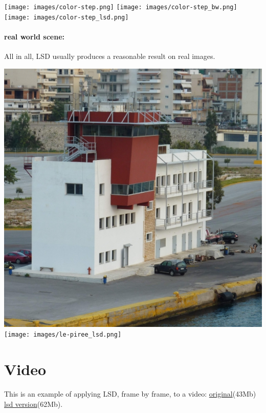 \documentclass{ipol}
\begin{document}
\begin{center}
\texttt{[image: images/color-step.png]}
\texttt{[image: images/color-step\_bw.png]}
\texttt{[image: images/color-step\_lsd.png]}
\end{center}

\paragraph{real world scene:} All in all, LSD usually produces a
reasonable result on real images.

\begin{center}
\includegraphics[scale=0.4]{images/le-piree.png}
\texttt{[image: images/le-piree\_lsd.png]}
\end{center}

\section{Video}

This is an example of applying LSD, frame by frame, to a video:
\href{http://www.ipol.im/pub/algo/gjmr_line_segment_detector/data/algo/gjmr_line_segment_detector/video.mov}{original}(43Mb)
\href{http://www.ipol.im/pub/algo/gjmr_line_segment_detector/data/algo/gjmr_line_segment_detector/video.lsd.mp4}{lsd version}(62Mb).
\end{document}
